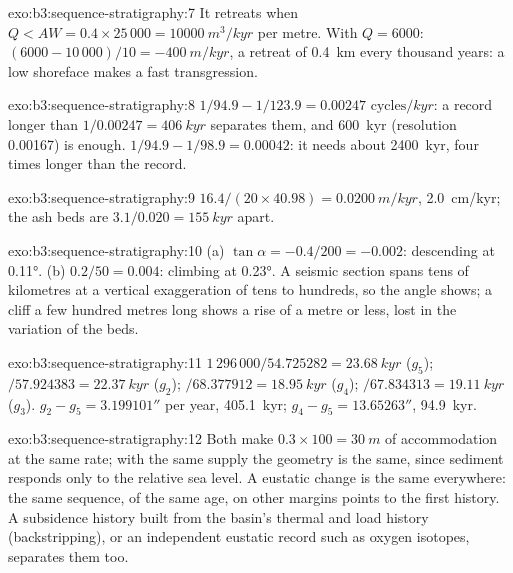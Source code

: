 \begin{solution}{exo:b3:sequence-stratigraphy:7}
It retreats when $Q < AW = 0.4\times25\,000 = \qty{10000}{m^3/kyr}$ per
metre. With $Q = 6000$: $(6000 - 10\,000)/10 = \qty{-400}{m/kyr}$, a retreat
of \qty{0.4}{km} every thousand years: a low shoreface makes a fast
transgression.
\end{solution}

\begin{solution}{exo:b3:sequence-stratigraphy:8}
$1/94.9 - 1/123.9 = \num{0.00247}\text{ cycles}/\unit{kyr}$: a record longer than
$1/0.00247 = \qty{406}{kyr}$ separates them, and \qty{600}{kyr} (resolution
0.00167) is enough. $1/94.9 - 1/98.9 = 0.00042$: it needs about
\qty{2400}{kyr}, four times longer than the record.
\end{solution}

\begin{solution}{exo:b3:sequence-stratigraphy:9}
$16.4/(20\times40.98) = \qty{0.0200}{m/kyr}$, \qty{2.0}{cm/kyr}; the ash beds
are $3.1/0.020 = \qty{155}{kyr}$ apart.
\end{solution}

\begin{solution}{exo:b3:sequence-stratigraphy:10}
(a) $\tan\alpha = -0.4/200 = -0.002$: descending at \ang{0.11}. (b)
$0.2/50 = 0.004$: climbing at \ang{0.23}. A seismic section spans tens of
kilometres at a vertical exaggeration of tens to hundreds, so the angle shows;
a cliff a few hundred metres long shows a rise of a metre or less, lost in
the variation of the beds.
\end{solution}

\begin{solution}{exo:b3:sequence-stratigraphy:11}
$1\,296\,000/54.725282 = \qty{23.68}{kyr}$ ($g_5$); $/57.924383 =
\qty{22.37}{kyr}$ ($g_2$); $/68.377912 = \qty{18.95}{kyr}$ ($g_4$);
$/67.834313 = \qty{19.11}{kyr}$ ($g_3$). $g_2 - g_5 = 3.199101''$ per year,
\qty{405.1}{kyr}; $g_4 - g_5 = 13.65263''$, \qty{94.9}{kyr}.
\end{solution}

\begin{solution}{exo:b3:sequence-stratigraphy:12}
Both make $0.3\times100 = \qty{30}{m}$ of accommodation at the same rate; with
the same supply the geometry is the same, since sediment responds only to the
relative sea level. A eustatic change is the same everywhere: the same
sequence, of the same age, on other margins points to the first history. A
subsidence history built from the basin's thermal and load history
(backstripping), or an independent eustatic record such as oxygen isotopes,
separates them too.
\end{solution}

